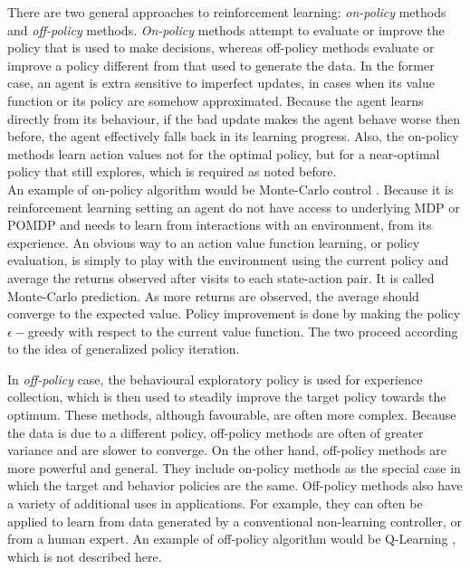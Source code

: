 There are two general approaches to reinforcement learning: \textit{on-policy} methods and \textit{off-policy} methods. \textit{On-policy} methods attempt to evaluate or improve the policy that is used to make decisions, whereas off-policy methods evaluate or improve a policy different from that used to generate the data. In the former case, an agent is extra sensitive to imperfect updates, in cases when its value function or its policy are somehow approximated. Because the agent learns directly from its behaviour, if the bad update makes the agent behave worse then before, the agent effectively falls back in its learning progress. Also, the on-policy methods learn action values not for the optimal policy, but for a near-optimal policy that still explores, which is required as noted before. \\
An example of on-policy algorithm would be Monte-Carlo control \cite{Book.RLAI}. Because it is reinforcement learning setting an agent do not have access to underlying MDP or POMDP and needs to learn from interactions with an environment, from its experience. An obvious way to an action value function learning, or policy evaluation, is simply to play with the environment using the current policy and average the returns observed after visits to each state-action pair. It is called Monte-Carlo prediction. As more returns are observed, the average should converge to the expected value. Policy improvement is done by making the policy $\epsilon-$greedy with respect to the current value function. The two proceed according to the idea of generalized policy iteration.

In \textit{off-policy} case, the behavioural exploratory policy is used for experience collection, which is then used to steadily improve the target policy towards the optimum. These methods, although favourable, are often more complex. Because the data is due to a different policy, off-policy methods are often of greater variance and are slower to converge. On the other hand, off-policy methods are more powerful and general. They include on-policy methods as the special case in which the target and behavior policies are the same. Off-policy methods also have a variety of additional uses in applications. For example, they can often be applied to learn from data generated by a conventional non-learning controller, or from a human expert. An example of off-policy algorithm would be Q-Learning \cite{Book.RLAI}, which is not described here.


